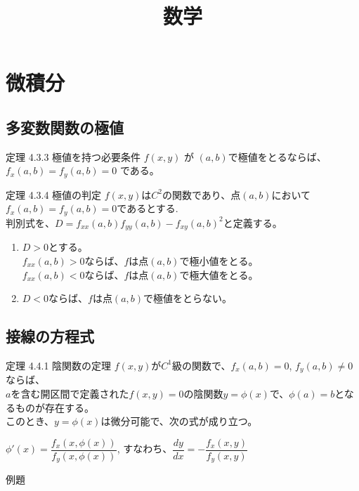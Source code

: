 \documentclass[a4paper]{jsarticle}
\author{}
\title{数学}
\date{}
\begin{document}
\maketitle

\section{微積分}
\subsection{多変数関数の極値}
\begin{itembox}[l]{定理 4.3.3 極値を持つ必要条件}
    $f\left(x,y\right)$ が $\left(a,b\right)$で極値をとるならば、
    $f_x\left(a,b\right)=f_y\left(a,b\right)=0$ である。
\end{itembox}
\begin{itembox}[l]{定理 4.3.4 極値の判定}
    $f\left(x,y\right)$は$C^2$の関数であり、点$\left(a,b\right)$において
    $f_x\left(a,b\right)=f_y\left(a, b\right)=0$であるとする.\\
    判別式を、$D=f_{xx}\left(a,b\right)f_{yy}\left(a,b\right)-f_{xy}(a,b)^2$と定義する。
    \begin{enumerate}
        \item $D>0$とする。\\
        $f_{xx}\left(a,b\right)>0$ならば、$f$は点$\left(a,b\right)$で極小値をとる。\\
        $f_{xx}\left(a,b\right)<0$ならば、$f$は点$\left(a,b\right)$で極大値をとる。
        \item $D<0$ならば、$f$は点$\left(a,b\right)$で極値をとらない。
    \end{enumerate}
\end{itembox}

\subsection{接線の方程式}
\begin{itembox}[l]{定理 4.4.1 陰関数の定理}
$f\left(x,y\right)$が$C^1$級の関数で、$f_x\left(a,b\right)=0$, $f_y\left(a,b\right)\neq0$ならば、\\
$a$を含む開区間で定義された$f(x,y)=0$の陰関数$y=\phi\left(x\right)$で、$\phi\left(a\right)=b$となるものが存在する。\\
このとき、$y=\phi\left(x\right)$は微分可能で、次の式が成り立つ。
\begin{center}
    $\phi'\left(x\right)=\dfrac{f_x\left(x,\phi\left(x\right)\right)}{f_y\left(x,\phi\left(x\right)\right)}$,
すなわち、$\dfrac{dy}{dx}=-\dfrac{f_x\left(x,y\right)}{f_y\left(x,y\right)}$
\end{center}
\end{itembox}
\begin{itembox}[l]{例題 }
    
\end{itembox}
\end{document}
